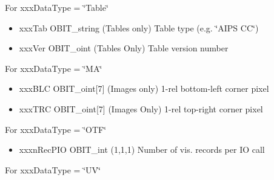 \begin{Desc}
\begin{description}
For xxx\-Data\-Type = \char`\"{}Table\char`\"{} \begin{itemize}
\item xxx\-Tab OBIT\_\-string (Tables only) Table type (e.g. \char`\"{}AIPS CC\char`\"{}) \item xxx\-Ver OBIT\_\-oint (Tables Only) Table version number\end{itemize}
For xxx\-Data\-Type = \char`\"{}MA\char`\"{} \begin{itemize}
\item xxx\-BLC OBIT\_\-oint[7] (Images only) 1-rel bottom-left corner pixel \item xxx\-TRC OBIT\_\-oint[7] (Images Only) 1-rel top-right corner pixel\end{itemize}
For xxx\-Data\-Type = \char`\"{}OTF\char`\"{} \begin{itemize}
\item xxxn\-Rec\-PIO OBIT\_\-int (1,1,1) Number of vis. records per IO call\end{itemize}
For xxx\-Data\-Type = \char`\"{}UV\char`\"{} \begin{itemize}

\end{itemize}
\end{description}
\end{Desc}
